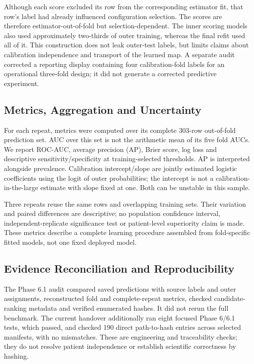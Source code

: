 \documentclass[conference]{IEEEtran}
\begin{document}
Although each score excluded its row from the corresponding estimator fit, that row's label had already influenced configuration selection. The scores are therefore estimator-out-of-fold but selection-dependent. The inner scoring models also used approximately two-thirds of outer training, whereas the final refit used all of it. This construction does not leak outer-test labels, but limits claims about calibration independence and transport of the learned map. A separate audit corrected a reporting display containing four calibration-fold labels for an operational three-fold design; it did not generate a corrected predictive experiment.

\subsection{Metrics, Aggregation and Uncertainty}
For each repeat, metrics were computed over its complete 303-row out-of-fold prediction set. AUC over this set is not the arithmetic mean of its five fold AUCs. We report ROC-AUC, average precision (AP), Brier score, log loss and descriptive sensitivity/specificity at training-selected thresholds. AP is interpreted alongside prevalence. Calibration intercept/slope are jointly estimated logistic coefficients using the logit of outer probabilities; the intercept is not a calibration-in-the-large estimate with slope fixed at one. Both can be unstable in this sample.

Three repeats reuse the same rows and overlapping training sets. Their variation and paired differences are descriptive; no population confidence interval, independent-replicate significance test or patient-level superiority claim is made. These metrics describe a complete learning procedure assembled from fold-specific fitted models, not one fixed deployed model.

\subsection{Evidence Reconciliation and Reproducibility}
The Phase 6.1 audit compared saved predictions with source labels and outer assignments, reconstructed fold and complete-repeat metrics, checked candidate-ranking metadata and verified enumerated hashes. It did not rerun the full benchmark. The current handover additionally ran eight focused Phase 6/6.1 tests, which passed, and checked 190 direct path-to-hash entries across selected manifests, with no mismatches. These are engineering and traceability checks; they do not resolve patient independence or establish scientific correctness by hashing.
\end{document}
